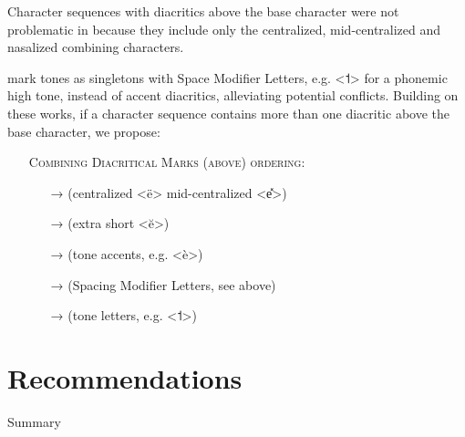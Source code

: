 Character sequences with diacritics above the base character were not
problematic in \citet{Moran2012} because they include only the centralized,
mid-centralized and nasalized combining characters. 

\citet{Moran2012,MoranMcCloy2014} mark
tones as singletons with Space Modifier Letters, e.g. \textless{}˦\textgreater{}
for a phonemic high tone, instead of accent diacritics, alleviating potential
conflicts. Building on these works, if a character sequence
contains more than one diacritic above the base character, we propose:

\begin{itemize}
	\item[] \textsc{Combining Diacritical Marks (above) ordering:}
	\begin{itemize}
	  \item[→] (centralized <ë> \textbar{} mid-centralized <e̽>)
	  \item[→] (extra short <ĕ>)
	  \item[→] (tone accents, e.g. <è>)
	  \item[→] (Spacing Modifier Letters, see above)
	  \item[→] (tone letters, e.g. <˦>)
	\end{itemize}	 
\end{itemize}

\section{Recommendations}
\label{ipa-recommendations}

Summary


